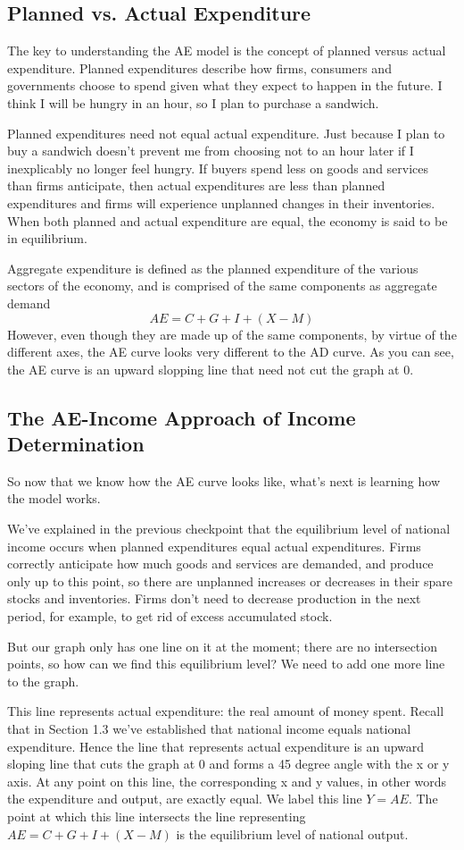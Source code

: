 \subsection{Planned vs. Actual Expenditure}
The key to understanding the AE model is the concept of planned versus actual expenditure. Planned expenditures describe how firms, consumers and governments choose to spend given what they expect to happen in the future. I think I will be hungry in an hour, so I plan to purchase a sandwich. 

Planned expenditures need not equal actual expenditure. Just because I plan to buy a sandwich doesn’t prevent me from choosing not to an hour later if I inexplicably no longer feel hungry. If buyers spend less on goods and services than firms anticipate, then actual expenditures are less than planned expenditures and firms will experience unplanned changes in their inventories. When both planned and actual expenditure are equal, the economy is said to be in equilibrium. 

Aggregate expenditure is defined as the planned expenditure of the various sectors of the economy, and is comprised of the same components as aggregate demand
$$AE = C + G + I + (X-M)$$
However, even though they are made up of the same components, by virtue of the different axes, the AE curve looks very different to the AD curve. As you can see, the AE curve is an upward slopping line that need not cut the graph at 0.
\subsection{The AE-Income Approach of Income Determination}
So now that we know how the AE curve looks like, what’s next is learning how the model works. 

We’ve explained in the previous checkpoint that the equilibrium level of national income occurs when planned expenditures equal actual expenditures. Firms correctly anticipate how much goods and services are demanded, and produce only up to this point, so there are unplanned increases or decreases in their spare stocks and inventories. Firms don’t need to decrease production in the next period, for example, to get rid of excess accumulated stock. 

But our graph only has one line on it at the moment; there are no intersection points, so how can we find this equilibrium level? We need to add one more line to the graph.

This line represents actual expenditure: the real amount of money spent. Recall that in Section 1.3 we’ve established that national income equals national expenditure. Hence the line that represents actual expenditure is an upward sloping line that cuts the graph at 0 and forms a 45 degree angle with the x or y axis. At any point on this line, the corresponding x and y values, in other words the expenditure and output, are exactly equal. We label this line $Y = AE$. The point at which this line intersects the line representing $AE = C + G + I + (X-M)$ is the equilibrium level of national output. 
